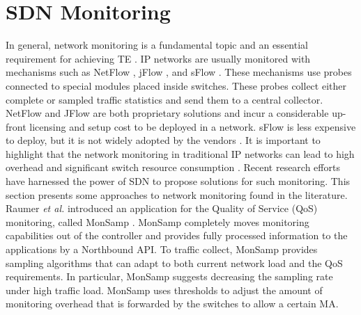 \section{SDN Monitoring}
\label{sec:related_work}

In general, network monitoring is a fundamental topic and an essential requirement for achieving TE \cite{feamster_2014:road_sdn,Boutaba2018,8255757}. IP networks are usually monitored with mechanisms such as NetFlow \cite{claise_2004:cisco}, jFlow \cite{myers_1999:jflow}, and sFlow \cite{wang_2004:sflow}. These mechanisms use probes connected to special modules placed inside switches. These probes collect either complete or sampled traffic statistics and send them to a central collector. NetFlow and JFlow are both proprietary solutions and incur a considerable up-front licensing and setup cost to be deployed in a network. sFlow is less expensive to deploy, but it is not widely adopted by the vendors \cite{chowdhury_2014:payless}. It is important to highlight that the network monitoring in traditional IP networks can lead to high overhead and significant switch resource consumption \cite{Curtis_2011:Mahout}. Recent research efforts have harnessed the power of SDN to propose solutions for such monitoring. This section presents some approaches to network monitoring found in the literature.\\

Raumer \textit{et al.} introduced an application for the Quality of Service (QoS) monitoring, called MonSamp \cite{raumer_2014:monsamp}. MonSamp completely moves monitoring capabilities out of the controller and provides fully processed information to the applications by a Northbound API. To traffic collect, MonSamp provides sampling algorithms that can adapt to both current network load and the QoS requirements. In particular, MonSamp suggests decreasing the sampling rate under high traffic load. MonSamp uses thresholds to adjust the amount of monitoring overhead that is forwarded by the switches to allow a certain MA.\\

